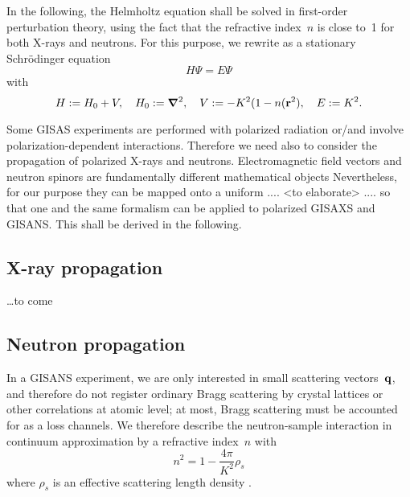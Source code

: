 In the following,
the Helmholtz equation 
shall be solved in first-order perturbation theory,
using the fact that the refractive index~$n$
is close to~1 for both X-rays and neutrons.
For this purpose,
we rewrite  as a stationary Schr\"odinger equation
\begin{equation}
  H\Psi = E\Psi
\end{equation}
with
\begin{equation*}
  H:=H_0+V,\quad
  H_0:=\bm{\nabla}^2,\quad
  V:=-K^2(1-n(\mathbf{r}^2),\quad
  E:=K^2.
\end{equation*}

Some GISAS experiments are performed with polarized radiation
or/and involve polarization-dependent interactions.
Therefore we need also to consider
the propagation of polarized X-rays and neutrons.
Electromagnetic field vectors and neutron spinors
are fundamentally different mathematical objects
Nevertheless, for our purpose they can be
mapped onto a uniform .... <to elaborate> ....
so that one and the same formalism can be applied
to polarized GISAXS and GISANS.
This shall be derived in the following.

\subsection{X-ray propagation}

\ldots to come

\subsection{Neutron propagation}

In a GISANS experiment,
we are only interested in small scattering vectors~$\mathbf{q}$,
and therefore do not register ordinary Bragg scattering
by crystal lattices or other correlations at atomic level;
at most, Bragg scattering must be accounted for as a loss channels.
We therefore describe the neutron-sample interaction
in continuum approximation by a refractive index~$n$ with
\begin{equation}
  n^2=1-\frac{4\pi}{K^2}\rho_s
\end{equation}
where $\rho_s$ is an effective scattering length density
\cite{Lax51,Sea89}.

